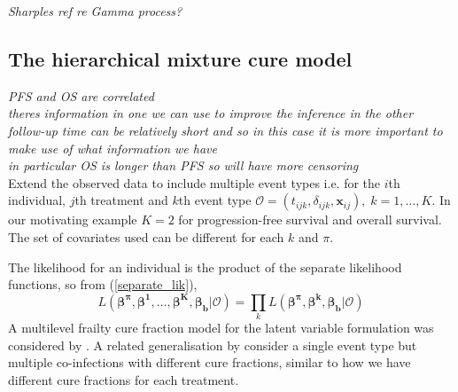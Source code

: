 \documentclass[AMA,STIX1COL]{WileyNJD-v2}
\begin{document}
{\it Sharples ref re Gamma process?}




\subsection{The hierarchical mixture cure model}
{\it PFS and OS are correlated\\
theres information in one we can use to improve the inference in the other\\
follow-up time can be relatively short and so in this case it is more important to make use of what information we have\\
in particular OS is longer than PFS so will have more censoring}\\

Extend the observed data to include multiple event types
i.e. for the $i$th individual, $j$th treatment and $k$th event type 
$\mathcal{O} = (t_{ijk}, \delta_{ijk}, \boldsymbol{x}_{ij}), \; k = 1, \ldots, K$.
In our motivating example $K = 2$ for progression-free survival and overall survival.
The set of covariates used can be different for each $k$ and $\pi$.

The likelihood for an individual is the product of the separate likelihood functions, so from (\ref{separate_lik}),
$$
L(\boldsymbol{\beta^{\pi}}, \boldsymbol{\beta^1}, \ldots, \boldsymbol{\beta^K}, \boldsymbol{\beta_b} | \mathcal{O}) =
\prod_k L(\boldsymbol{\beta^{\pi}}, \boldsymbol{\beta^{k}}, \boldsymbol{\beta_b} | \mathcal{O})
$$
A multilevel frailty cure fraction model for the latent variable formulation was considered by \cite{Tawiah2020}.
A related generalisation by \cite{Balogun2020} consider a single event type but multiple co-infections with different cure fractions,
similar to how we have different cure fractions for each treatment.
\end{document}
